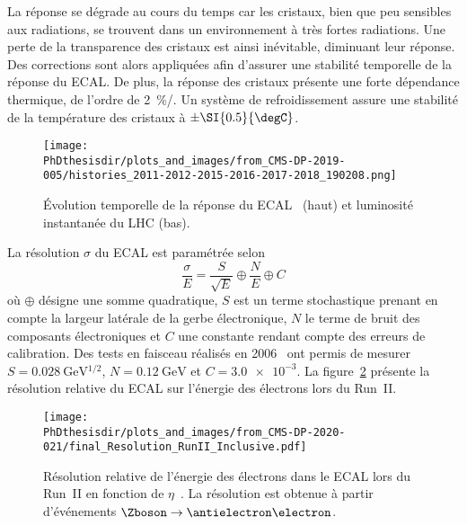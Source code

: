 La réponse se dégrade au cours du temps car les cristaux, bien que peu sensibles aux radiations, se trouvent dans un environnement à très fortes radiations.
Une perte de la transparence des cristaux est ainsi inévitable, diminuant leur réponse.
Des corrections sont alors appliquées afin d'assurer une stabilité temporelle de la réponse du ECAL.
De plus, la réponse des cristaux présente une forte dépendance thermique, de l'ordre de \SI{2}{\%/\degC}.
Un système de refroidissement assure une stabilité de la température des cristaux à $\pm\SI{0.5}{\degC}$.
\begin{figure}[h]
\centering
\texttt{[image: \\PhDthesisdir/plots\_and\_images/from\_CMS-DP-2019-005/histories\_2011-2012-2015-2016-2017-2018\_190208.png]}
\caption[Évolution temporelle de la réponse du ECAL.]{Évolution temporelle de la réponse du ECAL~\cite{CMS-DP-2019-005} (haut) et luminosité instantanée du LHC (bas).}
\label{fig-chapter-LHC-section-CMS-subsec-ECAL-CMS-DP-2019-005-histories_2011-2012-2015-2016-2017-2018_190208}
\end{figure}
\par La résolution $\sigma$ du ECAL est paramétrée selon
\begin{equation}
\frac{\sigma}{E}
=
\frac{S}{\sqrt{E}}
\oplus
\frac{N}{E}
\oplus
C
\end{equation}
où $\oplus$ désigne une somme quadratique,
$S$ est un terme stochastique prenant en compte la largeur latérale de la gerbe électronique,
$N$ le terme de bruit des composants électroniques et
$C$ une constante rendant compte des erreurs de calibration.
Des tests en faisceau réalisés en 2006~\cite{cms_paper} ont permis de mesurer
$S = \SI{0.028}{\GeV^{1/2}}$,
$N = \SI{0.12}{\GeV}$ et
$C = \num{3.0e-3}$.
La figure~\ref{fig-chapter-LHC-section-CMS-subsec-ECAL-CMS-DP-2020-021-final_Resolution_RunII_Inclusive} présente la résolution relative du ECAL sur l'énergie des électrons lors du Run~II.
\begin{figure}[h]
\centering
\texttt{[image: \\PhDthesisdir/plots\_and\_images/from\_CMS-DP-2020-021/final\_Resolution\_RunII\_Inclusive.pdf]}
\caption[Résolution relative de l'énergie des électrons dans le ECAL lors du Run~II.]{Résolution relative de l'énergie des électrons dans le ECAL lors du Run~II en fonction de $\eta$~\cite{CMS-DP-2020-021}. La résolution est obtenue à partir d'événements $\Zboson\to\antielectron\electron$.}
\label{fig-chapter-LHC-section-CMS-subsec-ECAL-CMS-DP-2020-021-final_Resolution_RunII_Inclusive}
\end{figure}